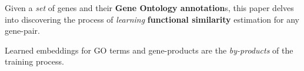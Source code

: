 \begin{sloppypar*}
    Given a \textit{set} of genes and their \textbf{Gene Ontology annotation}s,
    this paper delves into discovering the process of \textit{learning} \textbf{functional similarity}
    estimation for any gene-pair.  \hfill
    
    Learned embeddings for GO terms and gene-products are the \textit{by-products}
    of the training process.
\end{sloppypar*}